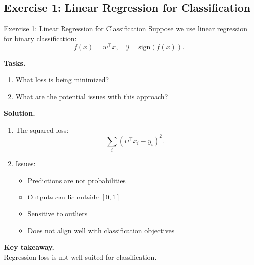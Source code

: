 \documentclass[aspectratio=169,11pt]{beamer}
\begin{document}
\subsection{Exercise 1: Linear Regression for Classification}
\begin{frame}[t,allowframebreaks]{Exercise 1: Linear Regression for Classification}
\small
Suppose we use linear regression for binary classification:
\[
f(x) = w^\top x, \quad \hat{y} = \text{sign}(f(x)).
\]

\textbf{Tasks.}\\ \begin{enumerate}
    \item What loss is being minimized?
    \item What are the potential issues with this approach?
\end{enumerate}

\textbf{Solution.}\\ \begin{enumerate}
\item The squared loss:
\[
\sum_i (w^\top x_i - y_i)^2.
\]

\item Issues:
\begin{itemize}
    \item Predictions are not probabilities
    \item Outputs can lie outside $[0,1]$
    \item Sensitive to outliers
    \item Does not align well with classification objectives
\end{itemize}
\end{enumerate}

\textbf{Key takeaway.}\\ Regression loss is not well-suited for classification.
\end{frame}
\end{document}
